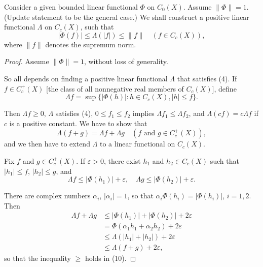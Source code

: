 \begin{lemma}
  \label{lem:exists_pos_lin_func}
  Consider a given bounded linear functional $\Phi$ on $C_0(X)$.
  Assume $\|\Phi\| = 1$. (Update statement to be the general case.)
  We shall construct a positive linear functional $\Lambda$ on $C_c(X)$, such that
  \begin{equation}
    |\Phi(f)| \leq \Lambda(|f|) \leq \|f\| \quad (f \in C_c(X)), \tag{4}
  \end{equation}
  where $\|f\|$ denotes the supremum norm.
\end{lemma}

\begin{proof}
  Assume $\|\Phi\| = 1$, without loss of generality.

  So all depends on finding a positive linear functional $\Lambda$ that satisfies (4). If $f \in C_c^+(X)$ [the class of all nonnegative real members of $C_c(X)$], define
  \begin{equation}
    \Lambda f = \sup \{|\Phi(h)| : h \in C_c(X), |h| \leq f\}. \tag{9}
  \end{equation}

  Then $\Lambda f \geq 0$, $\Lambda$ satisfies (4), $0 \leq f_1 \leq f_2$ implies $\Lambda f_1 \leq \Lambda f_2$, and $\Lambda(cf) = c\Lambda f$ if $c$ is a positive constant. We have to show that
  \begin{equation}
    \Lambda(f + g) = \Lambda f + \Lambda g \quad (f \text{ and } g \in C_c^+(X)), \tag{10}
  \end{equation}
  and we then have to extend $\Lambda$ to a linear functional on $C_c(X)$.

  Fix $f$ and $g \in C_c^+(X)$. If $\varepsilon > 0$, there exist $h_1$ and $h_2 \in C_c(X)$ such that $|h_1| \leq f$, $|h_2| \leq g$, and
  \begin{equation}
    \Lambda f \leq |\Phi(h_1)| + \varepsilon, \quad \Lambda g \leq |\Phi(h_2)| + \varepsilon. \tag{11}
  \end{equation}

  There are complex numbers $\alpha_i$, $|\alpha_i| = 1$, so that $\alpha_i \Phi(h_i) = |\Phi(h_i)|$, $i = 1, 2$. Then
  \begin{align}
    \Lambda f + \Lambda g & \leq |\Phi(h_1)| + |\Phi(h_2)| + 2\varepsilon      \\
                          & = \Phi(\alpha_1 h_1 + \alpha_2 h_2) + 2\varepsilon \\
                          & \leq \Lambda(|h_1| + |h_2|) + 2\varepsilon         \\
                          & \leq \Lambda(f + g) + 2\varepsilon,
  \end{align}
  so that the inequality $\geq$ holds in (10).


\end{proof}
